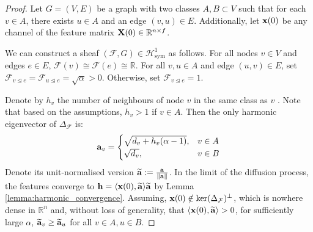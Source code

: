 \documentclass{article}
\def\va{{\bf{a}}}
\def\vh{{\bf{h}}}
\def\vx{{\bf{x}}}
\def\mX{{\bf{X}}}
\def\gF{{\mathcal{F}}}
\def\gH{{\mathcal{H}}}
\def\sR{{\mathbb{R}}}
\newcommand{\tleq}{\trianglelefteq}
\DeclarePairedDelimiter{\norm}{\lVert}{\rVert}
\begin{document}
\HOneSymHomophily*
\begin{proof}
Let $G = (V, E)$ be a graph with two classes $A, B \subset V$ such that for each $v \in A$, there exists $u \in A$ and an edge $(v, u) \in E$. Additionally, let $\vx(0)$ be any channel of the feature matrix $\mX(0) \in \sR^{n \times f}$. 

We can construct a sheaf $(\gF, G) \in \gH^1_{\mathrm{sym}}$ as follows. For all nodes $v \in V$ and edges $e \in E$, $\gF(v) \cong \gF(e) \cong \sR$. For all $v, u \in A$ and edge $(u, v) \in E$, set $\gF_{v \tleq e} = \gF_{u \tleq e} = \sqrt{\alpha} > 0$. Otherwise, set $\gF_{v \tleq e} = 1$. 

Denote by $h_v$ the number of neighbours of node $v$ in the same class as $v$ . Note that based on the assumptions, $h_v > 1$ if $v \in A$. Then the only harmonic eigenvector of $\Delta_\gF$ is:
\begin{align}
    \va_v = 
    \begin{cases}
        \sqrt{d_v + h_v(\alpha - 1)}, & v \in A \\
        \sqrt{d_v}, & v \in B
    \end{cases}
\end{align}
Denote its unit-normalised version $\widetilde{\va} := \frac{\va}{\norm{\va}}$. In the limit of the diffusion process, the features converge to $\vh = \langle \vx(0),\widetilde{\va} \rangle \widetilde{\va}$ by Lemma \ref{lemma:harmonic_convergence}. Assuming, $\vx(0) \notin \mathrm{ker}(\Delta_\gF)^\perp$, which is nowhere dense in $\sR^n$ and, without loss of generality, that $\langle \vx(0),\widetilde{\va} \rangle > 0$, for sufficiently large $\alpha$, $\widetilde{\va}_v \geq \widetilde{\va}_u$ for all $v \in A, u \in B$. 
\end{proof}
\end{document}
